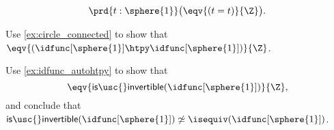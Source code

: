 \begin{exercises}
\begin{subexenum}
\begin{equation*}
\prd{t:\sphere{1}} \big(\eqv{(t=t)}{\Z}\big).
\end{equation*}
\item Use \cref{ex:circle_connected} to show that $\eqv{(\idfunc[\sphere{1}]\htpy\idfunc[\sphere{1}])}{\Z}$.
\item Use \cref{ex:idfunc_autohtpy} to show that
\begin{equation*}
\eqv{\mathsf{is\usc{}invertible}(\idfunc[\sphere{1}])}{\Z},
\end{equation*}
and conclude that ${\mathsf{is\usc{}invertible}}(\idfunc[\sphere{1}])\not\simeq{\isequiv(\idfunc[\sphere{1}])}$. 
\end{subexenum}
\end{exercises}

